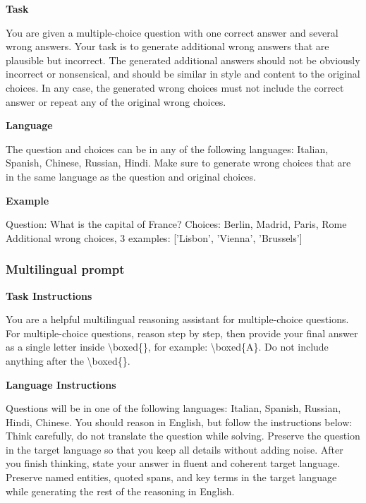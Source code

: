 \documentclass[11pt]{article}
\begin{document}
\begin{promptbox}
\textbf{Task}

You are given a multiple-choice question with one correct answer and several wrong answers. 
Your task is to generate additional wrong answers that are plausible but incorrect. 
The generated additional answers should not be obviously incorrect or nonsensical, and should be similar in style and content to the original choices.
In any case, the generated wrong choices must not include the correct answer or repeat any of the original wrong choices.

\textbf{Language}

The question and choices can be in any of the following languages: Italian, Spanish, Chinese, Russian, Hindi.
Make sure to generate wrong choices that are in the same language as the question and original choices.

\textbf{Example}

Question: What is the capital of France?
Choices: Berlin, Madrid, Paris, Rome
Additional wrong choices, 3 examples:
['Lisbon', 'Vienna', 'Brussels']
\end{promptbox}

\subsubsection{Multilingual prompt}\label{appendix:multilingual_cot_prompt}

\begin{promptbox}
\textbf{Task Instructions}

You are a helpful multilingual reasoning assistant for multiple-choice questions.
For multiple-choice questions, reason step by step, then provide your final answer as a single letter inside \textbackslash boxed\{\}, for example: \textbackslash boxed\{A\}.
Do not include anything after the \textbackslash boxed\{\}.

\textbf{Language Instructions}

Questions will be in one of the following languages: Italian, Spanish, Russian, Hindi, Chinese. 
You should reason in English, but follow the instructions below:
Think carefully, do not translate the question while solving. 
Preserve the question in the target language so that you keep all details without adding noise. 
After you finish thinking, state your answer in fluent and coherent target language.
Preserve named entities, quoted spans, and key terms in the target language while generating the rest of the reasoning in English.
\end{promptbox}
\end{document}
